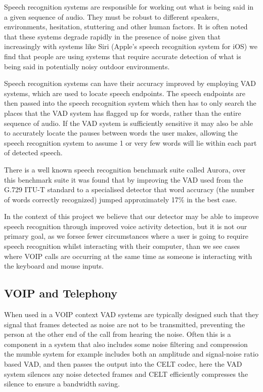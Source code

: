\documentclass[ %
                    author={Sam Phippen},
                supervisor={Dr. Rafal Bogacz},
                     title={Real time voice activity detectors in noisy personal computing environments},
                  subtitle={},
                    degree={MEng},
                      year={2012} ]{thesis}
\begin{document}
Speech recognition systems are responsible for working out what is being said
in a given sequence of audio. They must be robust to different speakers,
environments, hesitation, stuttering and other human factors. It is often noted
that these systems degrade rapidly in the presence of noise\cite{Moreno} given
that increasingly with systems like Siri\texttrademark\cite{siri} (Apple's
speech recognition system for iOS\texttrademark) we find that people are using
systems that require accurate detection of what is being said in potentially
noisy outdoor environments.

Speech recognition systems can have their accuracy improved\cite{shin} by
employing VAD systems, which are used to locate speech endpoints. The speech
endpoints are then passed into the speech recognition system which then has to
only search the places that the VAD system has flagged up for words, rather
than the entire sequence of audio. If the VAD system is sufficiently sensitive
it may also be able to accurately locate the pauses between words the user
makes, allowing the speech recognition system to assume 1 or very few words
will lie within each part of detected speech.

There is a well known speech recognition benchmark suite called
Aurora\cite{aurora}, over this benchmark suite it was found\cite{ramirez-2}
that by improving the VAD used from the G.729 ITU-T\cite{itut} standard to a
specialised detector that word accuracy (the number of words correctly
recognized) jumped approximately 17\% in the best case.

In the context of this project we believe that our detector may be able to
improve speech recognition through improved voice activity detection, but it is
not our primary goal, as we forsee fewer circumstances where a user is going to
require speech recognition whilst interacting with their computer, than we see
cases where VOIP calls are occurring at the same time as someone is interacting
with the keyboard and mouse inputs.

\clearpage
\subsection{VOIP and Telephony}

When used in a VOIP context VAD systems are typically designed such that they
signal that frames detected as noise are not to be transmitted, preventing the
person at the other end of the call from hearing the noise. Often this is a
component in a system that also includes some noise filtering and compression
the mumble\cite{mumble} system for example includes both an amplitude and
signal-noise ratio based VAD, and then passes the output into the
CELT\cite{celt} codec, here the VAD system silences any noise detected frames
and CELT efficiently compresses the silence to ensure a bandwidth saving.
\end{document}
